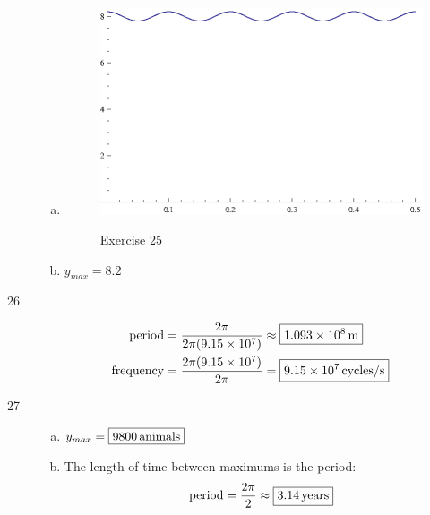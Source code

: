 \documentclass{exam}
\begin{document}
\begin{description}
\begin{enumerate}[(a)]
          \item 
            \begin{figure}[H]
              \centering
              \includegraphics{exercise25.eps}

              Exercise 25
            \end{figure}

          \item $y_{max} = \boxed{ 8.2 }$

        \end{enumerate}

      \item[26]
        \begin{align*}
          \text{period}    & = \frac{2 \pi}{2 \pi (9.15 \times 10^7)} \approx \boxed{ \unit[1.093 \times 10^8]{m} } \\
          \text{frequency} & = \frac{2 \pi (9.15 \times 10^7)}{2 \pi} = \boxed{ \unit[9.15 \times 10^7]{cycles/s} } \\
        \end{align*}

      \item[27]
        \begin{enumerate}[(a)]
          \item $y_{max} = \boxed{ \unit[9800]{animals} }$

          \item The length of time between maximums is the period:
            \[
              \text{period} = \frac{2 \pi}{2} \approx \boxed{ \unit[3.14]{years} } \\
            \]
        \end{enumerate}


\end{description}
\end{document}
